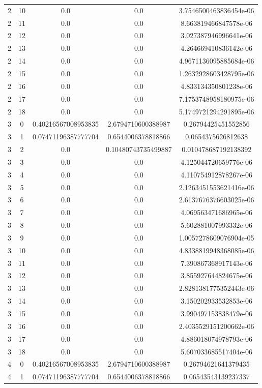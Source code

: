 \documentclass{article}
\begin{document}
\begin{table}[h]
\begin{tabular}{|c|c|c|c|c|}
2 & 10 & 0.0 & 0.0 & 3.7546500463836454e-06 \\
2 & 11 & 0.0 & 0.0 & 8.663819466847578e-06 \\
2 & 12 & 0.0 & 0.0 & 3.027387946996641e-06 \\
2 & 13 & 0.0 & 0.0 & 4.264669410836142e-06 \\
2 & 14 & 0.0 & 0.0 & 4.9671136095885684e-06 \\
2 & 15 & 0.0 & 0.0 & 1.2632928603428795e-06 \\
2 & 16 & 0.0 & 0.0 & 4.833134350801238e-06 \\
2 & 17 & 0.0 & 0.0 & 7.1753748958180975e-06 \\
2 & 18 & 0.0 & 0.0 & 5.1749721294291895e-06 \\
3 & 0 & 0.40216567008953835 & 2.6794710600388987 & 0.26794425451552856 \\
3 & 1 & 0.07471196387777704 & 0.6544006378818866 & 0.0654375626812638 \\
3 & 2 & 0.0 & 0.10480743735499887 & 0.010478687192138392 \\
3 & 3 & 0.0 & 0.0 & 4.125044720659776e-06 \\
3 & 4 & 0.0 & 0.0 & 4.110754912878267e-06 \\
3 & 5 & 0.0 & 0.0 & 2.1263451553621416e-06 \\
3 & 6 & 0.0 & 0.0 & 2.6137676376603025e-06 \\
3 & 7 & 0.0 & 0.0 & 4.069563471686965e-06 \\
3 & 8 & 0.0 & 0.0 & 5.602881007993332e-06 \\
3 & 9 & 0.0 & 0.0 & 1.0057278609076904e-05 \\
3 & 10 & 0.0 & 0.0 & 4.8338819948368085e-06 \\
3 & 11 & 0.0 & 0.0 & 7.390867368917143e-06 \\
3 & 12 & 0.0 & 0.0 & 3.855927644824675e-06 \\
3 & 13 & 0.0 & 0.0 & 2.8281381775352443e-06 \\
3 & 14 & 0.0 & 0.0 & 3.150202933532853e-06 \\
3 & 15 & 0.0 & 0.0 & 3.990497153838479e-06 \\
3 & 16 & 0.0 & 0.0 & 2.4035529151200662e-06 \\
3 & 17 & 0.0 & 0.0 & 4.886018074978793e-06 \\
3 & 18 & 0.0 & 0.0 & 5.607033685517404e-06 \\
4 & 0 & 0.40216567008953835 & 2.6794710600388987 & 0.26794621641379435 \\
4 & 1 & 0.07471196387777704 & 0.6544006378818866 & 0.06543543139237337 \\

\end{tabular}
\end{table}
\end{document}
